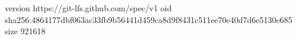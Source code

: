version https://git-lfs.github.com/spec/v1
oid sha256:4864177dbf063ac33fb9b56441d459ca8d9f8431c511ee70e40d7d6e5130e685
size 921618
